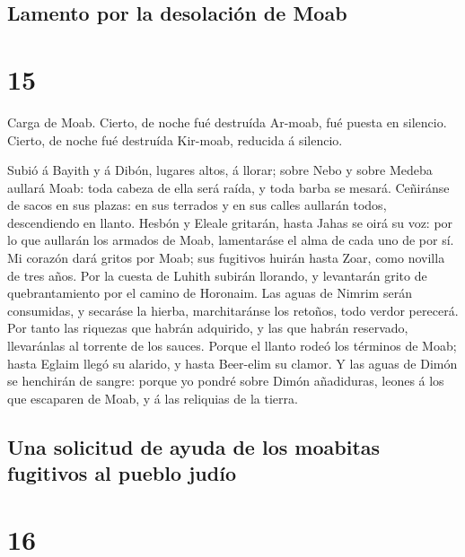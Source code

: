 \hypertarget{lamento-por-la-desolaciuxf3n-de-moab}{%
\subsection{Lamento por la desolación de
Moab}\label{lamento-por-la-desolaciuxf3n-de-moab}}

\hypertarget{section-14}{%
\section{15}\label{section-14}}

 Carga de Moab. Cierto, de noche fué destruída Ar-moab,
fué puesta en silencio. Cierto, de noche fué destruída Kir-moab,
reducida á silencio.

 Subió á Bayith y á Dibón, lugares altos, á llorar; sobre
Nebo y sobre Medeba aullará Moab: toda cabeza de ella será raída, y toda
barba se mesará.  Ceñiránse de sacos en sus plazas: en sus
terrados y en sus calles aullarán todos, descendiendo en llanto.
 Hesbón y Eleale gritarán, hasta Jahas se oirá su voz: por
lo que aullarán los armados de Moab, lamentaráse el alma de cada uno de
por sí.  Mi corazón dará gritos por Moab; sus fugitivos
huirán hasta Zoar, como novilla de tres años. Por la cuesta de Luhith
subirán llorando, y levantarán grito de quebrantamiento por el camino de
Horonaim.  Las aguas de Nimrim serán consumidas, y
secaráse la hierba, marchitaránse los retoños, todo verdor perecerá.
 Por tanto las riquezas que habrán adquirido, y las que
habrán reservado, llevaránlas al torrente de los sauces. 
Porque el llanto rodeó los términos de Moab; hasta Eglaim llegó su
alarido, y hasta Beer-elim su clamor.  Y las aguas de
Dimón se henchirán de sangre: porque yo pondré sobre Dimón añadiduras,
leones á los que escaparen de Moab, y á las reliquias de la tierra.

\hypertarget{una-solicitud-de-ayuda-de-los-moabitas-fugitivos-al-pueblo-juduxedo}{%
\subsection{Una solicitud de ayuda de los moabitas fugitivos al pueblo
judío}\label{una-solicitud-de-ayuda-de-los-moabitas-fugitivos-al-pueblo-juduxedo}}

\hypertarget{section-15}{%
\section{16}\label{section-15}}

